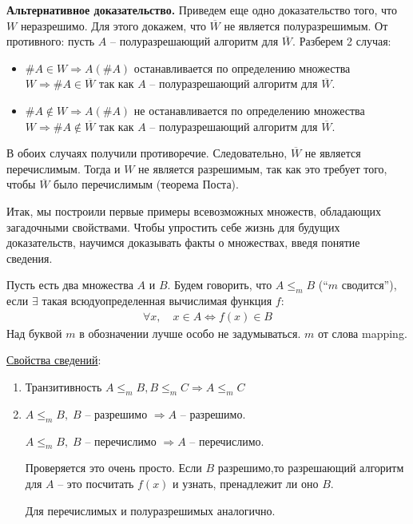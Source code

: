 \vspace{5mm}

\textbf{Альтернативное доказательство.}
Приведем еще одно доказательство того, что $W$ неразрешимо. Для этого докажем, что $\overline{W}$ не является полуразрешимым. От противного: пусть $A$ -- полуразрешающий алгоритм для $\overline{W}$. Разберем 2 случая: \begin{itemize}
    \item $\#A \in W \Rightarrow A(\#A)$ останавливается по определению множества $W \Rightarrow \#A \in \overline{W}$ так как $A$ -- полуразрешающий алгоритм для $\overline{W}$.
    \item $\#A \notin W \Rightarrow A(\#A)$ не останавливается по определению множества $W \Rightarrow \#A \notin \overline{W}$ так как $A$ -- полуразрешающий алгоритм для $\overline{W}$.
\end{itemize}
В обоих случаях получили противоречие. Следовательно, $\overline{W}$ не является перечислимым. Тогда и $W$ не является разрешимым, так как это требует того, чтобы $\overline{W}$ было перечислимым (теорема Поста). 

\vspace{5mm}

Итак, мы построили первые примеры всевозможных множеств, обладающих загадочными свойствами. Чтобы упростить себе жизнь для будущих доказательств, научимся доказывать факты о множествах, введя понятие сведения. 
\begin{conj}
    Пусть есть два множества $A$ и $B$. Будем говорить, что $A \leqslant_m B$ (``$m$ сводится''), если $\exists$ такая всюдуопределенная вычислимая функция $f$:
    \begin{gather*}
        \forall x, \quad x \in A \Longleftrightarrow f(x) \in B
    \end{gather*} 
    Над буквой $m$ в обозначении лучше особо не задумываться. $m$ от слова mapping.  
\end{conj}

\underline{Свойства сведений}:
\begin{enumerate}
    \item Транзитивность \qquad $A \leqslant_m B, B \leqslant_m C \Longrightarrow A \leqslant_m C$
    \item $A \leqslant_m B, \; B$ -- разрешимо $\Longrightarrow A$ -- разрешимо. 
    
    $A \leqslant_m B, \; B$ -- перечислимо $\Longrightarrow A$ -- перечислимо.  

    Проверяется это очень просто. Если $B$ разрешимо,то разрешающий алгоритм для $A$ -- это посчитать $f(x)$ и узнать, пренадлежит ли оно $B$. 

    Для перечислимых и полуразрешимых аналогично.
\end{enumerate}

